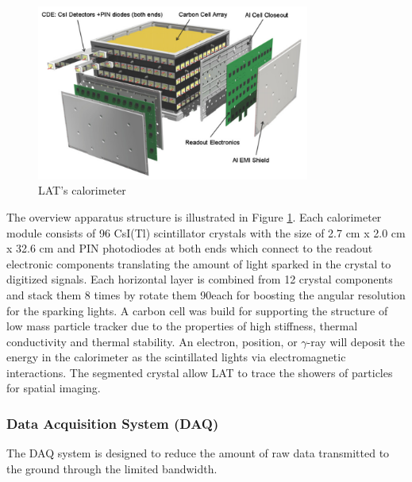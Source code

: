 \begin{figure}[h!]
    \centering
    \includegraphics[width=0.8\textwidth]{content/background/figures/fermi_calorimeter.png}
    \caption{LAT's calorimeter \citep{FermiLAT}}
    \label{fig:fermi_calorimeter}
\end{figure}

The overview apparatus structure is illustrated in Figure \ref{fig:fermi_calorimeter}.
Each calorimeter module consists of 96 CsI(Tl) scintillator
crystals with the size of
2.7 cm x 2.0 cm x 32.6 cm and PIN photodiodes at both ends which connect 
to the readout electronic components translating the amount of light 
sparked in the crystal to digitized signals. Each horizontal 
layer is combined from 12 crystal components and stack them 8 times by 
rotate them 90\textdegree each for boosting the angular resolution 
for the sparking lights. A carbon cell was build for supporting 
the structure of low mass particle tracker due to the properties of 
high stiffness, thermal conductivity and thermal stability.
An electron, position, or $\gamma$-ray will deposit the energy in the
calorimeter as the scintillated lights via electromagnetic interactions.
The segmented
crystal allow LAT to trace the showers of particles for spatial imaging.




\subsubsection{Data Acquisition System (DAQ)}

The DAQ system is designed to reduce the amount of raw data
transmitted to the ground through the limited bandwidth. 

